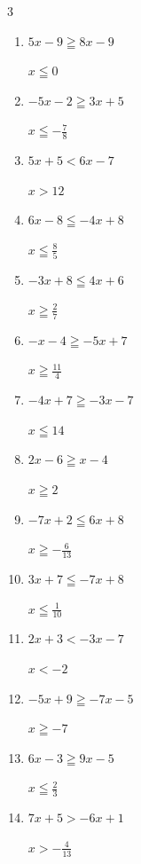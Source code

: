 \begin{multicols}{3}
\begin{enumerate}
  \item $5x-9\geqq 8x-9$

        $\displaystyle x\leqq 0$

  \item $-5x-2\geqq 3x+5$

        $\displaystyle x\leqq -\frac{7}{8}$

  \item $5x+5<6x-7$

        $\displaystyle x>12$

  \item $6x-8\leqq -4x+8$

        $\displaystyle x\leqq \frac{8}{5}$

  \item $-3x+8\leqq 4x+6$

        $\displaystyle x\geqq \frac{2}{7}$

  \item $-x-4\geqq -5x+7$

        $\displaystyle x\geqq \frac{11}{4}$

  \item $-4x+7\geqq -3x-7$

        $\displaystyle x\leqq 14$

  \item $2x-6\geqq x-4$

        $\displaystyle x\geqq 2$

  \item $-7x+2\leqq 6x+8$

        $\displaystyle x\geqq -\frac{6}{13}$

  \item $3x+7\leqq -7x+8$

        $\displaystyle x\leqq \frac{1}{10}$

  \item $2x+3<-3x-7$

        $\displaystyle x<-2$

  \item $-5x+9\geqq -7x-5$

        $\displaystyle x\geqq -7$

  \item $6x-3\geqq 9x-5$

        $\displaystyle x\leqq \frac{2}{3}$

  \item $7x+5>-6x+1$

        $\displaystyle x>-\frac{4}{13}$

\columnbreak %


\end{enumerate}
\end{multicols}
